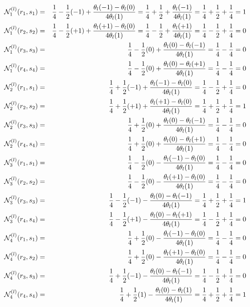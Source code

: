 \begin{eqnarray}
{\mathcal{N}}_1^{(l)}(r_1,s_1) 
&=& \frac{1}{4} -\frac{1}{2} (-1) + \frac{\theta_l(-1)-\theta_l(0)}{4 \theta_l(1)}  
= \frac{1}{4} +\frac{1}{2}  + \frac{\theta_l(-1)}{4 \theta_l(1)}  
= \frac{1}{4} +\frac{1}{2}  + \frac{1}{4}   = 1 \nonumber\\
{\mathcal{N}}_1^{(l)}(r_2,s_2)
&=& \frac{1}{4} -\frac{1}{2} (+1) + \frac{\theta_l(+1)-\theta_l(0)}{4 \theta_l(1)}  
= \frac{1}{4} -\frac{1}{2} + \frac{\theta_l(+1)}{4 \theta_l(1)}  
= \frac{1}{4} -\frac{1}{2} + \frac{1}{4}   = 0 \nonumber\\
{\mathcal{N}}_1^{(l)}(r_3,s_3)
&=& \frac{1}{4} -\frac{1}{2} (0) + \frac{\theta_l(0)-\theta_l(-1)}{4 \theta_l(1)}  
= \frac14 -\frac14  = 0 \nonumber\\
{\mathcal{N}}_1^{(l)}(r_4,s_4)
&=& \frac{1}{4} -\frac{1}{2} (0) + \frac{\theta_l(0)-\theta_l(+1)}{4 \theta_l(1)}  
= \frac14 -\frac14  = 0 \nonumber\\
{\mathcal{N}}_2^{(l)}(r_1,s_1) 
&=& \frac{1}{4} + \frac{1}{2} (-1) + \frac{\theta_l(-1)-\theta_l(0)}{4 \theta_l(1)}  
= \frac14 -\frac12 + \frac14 = 0 \nonumber\\
{\mathcal{N}}_2^{(l)}(r_2,s_2)
&=& \frac{1}{4} + \frac{1}{2} (+1) + \frac{\theta_l(+1)-\theta_l(0)}{4 \theta_l(1)}  
= \frac14 + \frac12 + \frac14 =1 \nonumber\\
{\mathcal{N}}_2^{(l)}(r_3,s_3)
&=& \frac{1}{4} + \frac{1}{2} (0) + \frac{\theta_l(0)-\theta_l(-1)}{4 \theta_l(1)}  
= \frac14 - \frac14 = 0 \nonumber\\
{\mathcal{N}}_2^{(l)}(r_4,s_4)
&=& \frac{1}{4} + \frac{1}{2} (0) + \frac{\theta_l(0)-\theta_l(+1)}{4 \theta_l(1)}  
= \frac14 - \frac14 = 0 \nonumber\\
{\mathcal{N}}_3^{(l)}(r_1,s_1)
&=& \frac{1}{4} - \frac{1}{2} (0) - \frac{\theta_l(-1)-\theta_l(0)}{4 \theta_l(1)} 
= \frac14 -\frac14 = 0\nonumber\\
{\mathcal{N}}_3^{(l)}(r_2,s_2)
&=& \frac{1}{4} - \frac{1}{2} (0) - \frac{\theta_l(+1)-\theta_l(0)}{4 \theta_l(1)} 
= \frac14 -\frac14 = 0\nonumber\\
{\mathcal{N}}_3^{(l)}(r_3,s_3)
&=& \frac{1}{4} - \frac{1}{2} (-1) - \frac{\theta_l(0)-\theta_l(-1)}{4 \theta_l(1)} 
= \frac14 +\frac12 + \frac14 = 1\nonumber\\
{\mathcal{N}}_3^{(l)}(r_4,s_4)
&=& \frac{1}{4} - \frac{1}{2} (+1) - \frac{\theta_l(0)-\theta_l(+1)}{4 \theta_l(1)} 
= \frac14 -\frac12 + \frac14 = 0\nonumber\\
{\mathcal{N}}_4^{(l)}(r_1,s_1)
&=& \frac{1}{4} + \frac{1}{2} (0) - \frac{\theta_l(-1)-\theta_l(0)}{4 \theta_l(1)}  
= \frac14 -\frac14 =0\nonumber\\
{\mathcal{N}}_4^{(l)}(r_2,s_2)
&=& \frac{1}{4} + \frac{1}{2} (0) - \frac{\theta_l(+1)-\theta_l(0)}{4 \theta_l(1)}  
= \frac14 -\frac14 =0\nonumber\\
{\mathcal{N}}_4^{(l)}(r_3,s_3)
&=& \frac{1}{4} + \frac{1}{2} (-1) - \frac{\theta_l(0)-\theta_l(-1)}{4 \theta_l(1)}  
= \frac14 -\frac12 +\frac14 = 0 \nonumber\\
{\mathcal{N}}_4^{(l)}(r_4,s_4)
&=& \frac{1}{4} + \frac{1}{2} (1) - \frac{\theta_l(0)-\theta_l(1)}{4 \theta_l(1)}  
= \frac14 +\frac12 +\frac14 = 1 \nonumber
\end{eqnarray}


